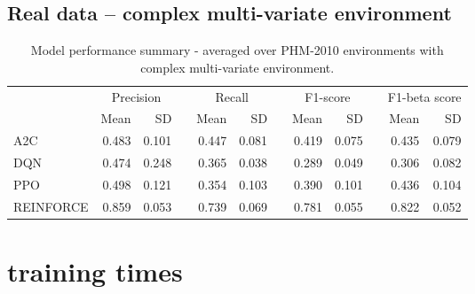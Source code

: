 \documentclass[]{article}
\newcommand{\rowspace}[1]{\renewcommand{\arraystretch}{#1}}
\begin{document}
\subsection{Real data -- complex multi-variate environment}
\begin{table*}[hbt!]\centering
	\sffamily
	\rowspace{1.3}
	\begin{tabular}{@{}l rr c rr c rr c rr@{}}
		\arrayrulecolor{black!40}\toprule
		& \multicolumn{2}{c}{Precision} & \phantom{i} & \multicolumn{2}{c}{Recall} & \phantom{i} & \multicolumn{2}{c}{F1-score} & \phantom{i} & \multicolumn{2}{c}{F1-beta score} \\
		\cmidrule{2-3} \cmidrule{5-6} \cmidrule{8-9} \cmidrule{11-12} 
		
		&Mean &SD & &Mean &SD & &Mean &SD& &Mean & SD\\ \midrule
		A2C & 0.483 & 0.101 & &0.447 & 0.081 & & 0.419 & 0.075 & &0.435 &0.079 \\
		DQN & 0.474 & 0.248 & &0.365 & 0.038 & & 0.289 & 0.049 & &0.306 &0.082 \\
		PPO & 0.498 & 0.121 & &0.354 & 0.103 & & 0.390 & 0.101 & &0.436 &0.104 \\
		REINFORCE & 0.859 & 0.053 & &0.739 & 0.069 & & 0.781 & 0.055 & &0.822 &0.052 \\
		\bottomrule
	\end{tabular}
	\caption{Model performance summary - averaged over PHM-2010 environments with complex multi-variate environment.}
	\label{tbl:PHMMS}
\end{table*}

\section{training times}
\end{document}
